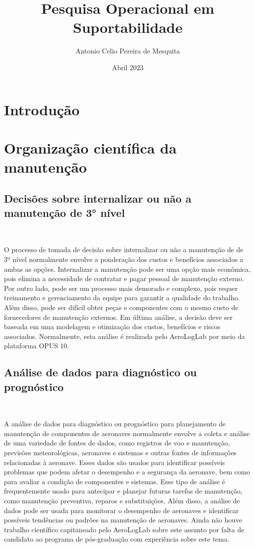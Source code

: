 \documentclass{article}
\title{Pesquisa Operacional em Suportabilidade}
\author{Antonio Celio Pereira de Mesquita}
\date{ Abril 2023}
\begin{document}
\maketitle
\section{Introdução}


\section{Organização científica da manutenção}


\subsection{Decisões sobre internalizar ou não a manutenção de 3° nível}\

O processo de tomada de decisão sobre internalizar ou não a manutenção de de 3º nível normalmente envolve a ponderação dos custos e benefícios associados a ambas as opções. Internalizar a manutenção pode ser uma opção mais econômica, pois elimina a necessidade de contratar e pagar pessoal de manutenção externo. Por outro lado, pode ser um processo mais demorado e complexo, pois requer treinamento e gerenciamento da equipe para garantir a qualidade do trabalho. Além disso, pode ser difícil obter peças e componentes com o mesmo custo de fornecedores de manutenção externos. Em última análise, a decisão deve ser baseada em uma modelagem e otimização dos custos, benefícios e riscos associados.
Normalmente, esta análise é realizada pelo AeroLogLab por meio da plataforma OPUS 10.

\subsection{Análise de dados para diagnóstico ou prognóstico}\

A análise de dados para diagnóstico ou prognóstico para planejamento de manutenção de componentes de aeronaves normalmente envolve a coleta e análise de uma variedade de fontes de dados, como registros de voo e manutenção, previsões meteorológicas, aeronaves e sistemas e outras fontes de informações relacionadas à aeronave. Esses dados são usados para identificar possíveis problemas que podem afetar o desempenho e a segurança da aeronave, bem como para avaliar a condição de componentes e sistemas.
Esse tipo de análise é frequentemente usado para antecipar e planejar futuras tarefas de manutenção, como manutenção preventiva, reparos e substituições. Além disso, a análise de dados pode ser usada para monitorar o desempenho de aeronaves e identificar possíveis tendências ou padrões na manutenção de aeronaves.
Ainda não houve trabalho científico capitaneado pelo AeroLogLab sobre este assunto por falta de candidato ao programa de pós-graduação com experiência sobre este tema.
\end{document}
